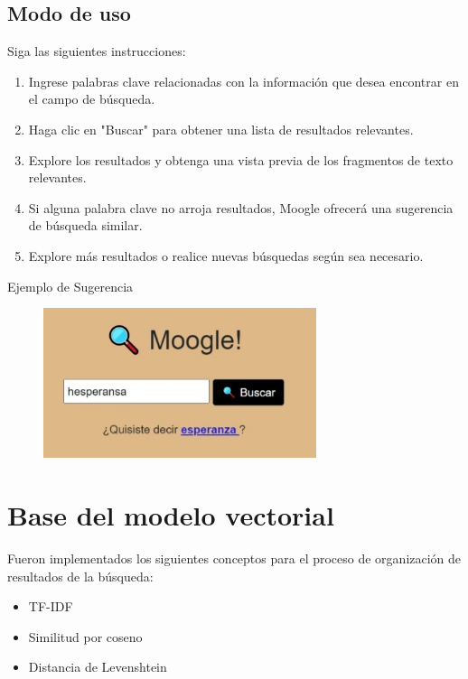 \documentclass{beamer}
\begin{document}
\subsection{Modo de uso}
\begin{frame}

Siga las siguientes instrucciones:
\begin{enumerate}
\item Ingrese palabras clave relacionadas con la información que desea encontrar en el campo de búsqueda.
\item Haga clic en "Buscar" para obtener una lista de resultados relevantes.
\item Explore los resultados y obtenga una vista previa de los fragmentos de texto relevantes.
\item Si alguna palabra clave no arroja resultados, Moogle ofrecerá una  sugerencia de búsqueda similar.
\item Explore más resultados o realice nuevas búsquedas según sea necesario.
\end{enumerate}



\end{frame}
\begin{frame}{Ejemplo de Sugerencia}
\begin{figure}[h]
       \center
       \includegraphics[width=8cm]{Web3.jpg}
\end{figure}
\end{frame}

\section{Base del modelo vectorial}
\begin{frame}
Fueron implementados los siguientes conceptos para el proceso de organización de resultados de la búsqueda:
\begin{itemize}
\item TF-IDF
\item Similitud por coseno
\item Distancia de Levenshtein
\end{itemize}
\end{frame}
\end{document}

